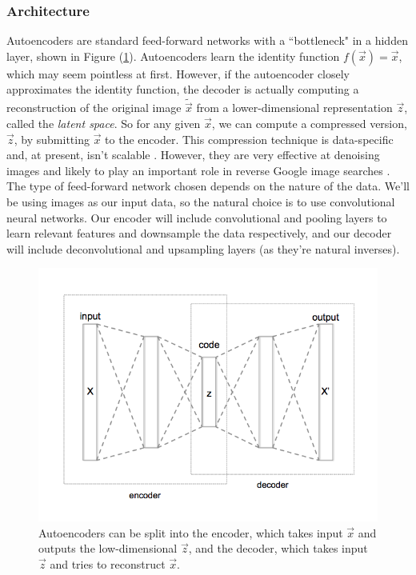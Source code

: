 \documentclass[12pt,twoside]{article}
\begin{document}
\subsubsection{Architecture}

Autoencoders are standard feed-forward networks with a ``bottleneck" in a hidden layer, shown in Figure (\ref{fig:autoencoder_encoder_decoder}). Autoencoders learn the identity function $f(\vec{x})=\vec{x}$, which may seem pointless at first. However, if the autoencoder closely approximates the identity function, the decoder is actually computing a reconstruction of the original image $\widetilde{\vec{x}}$ from a lower-dimensional representation $\vec{z}$, called the \textit{latent space}. So for any given $\vec{x}$, we can compute a compressed version, $\vec{z}$, by submitting $\vec{x}$ to the encoder. This compression technique is data-specific and, at present, isn't scalable \cite{Chollet2016}. However, they are very effective at denoising images and likely to play an important role in reverse Google image searches \cite{Krizhevsky2011}.\\

The type of feed-forward network chosen depends on the nature of the data. We'll be using images as our input data, so the natural choice is to use convolutional neural networks. Our encoder will include convolutional and pooling layers to learn relevant features and downsample the data respectively, and our decoder will include deconvolutional and upsampling layers (as they're natural inverses).

\begin{figure}
\includegraphics[scale=0.5]{figures/autoencoder_encoder_decoder.png}
\centering
\captionsetup{justification=centering}
\caption{Autoencoders can be split into the encoder, which takes input $\vec{x}$ and outputs the low-dimensional $\vec{z}$, and the decoder, which takes input $\vec{z}$ and tries to reconstruct $\vec{x}$.}
\label{fig:autoencoder_encoder_decoder}
\end{figure}
\end{document}
